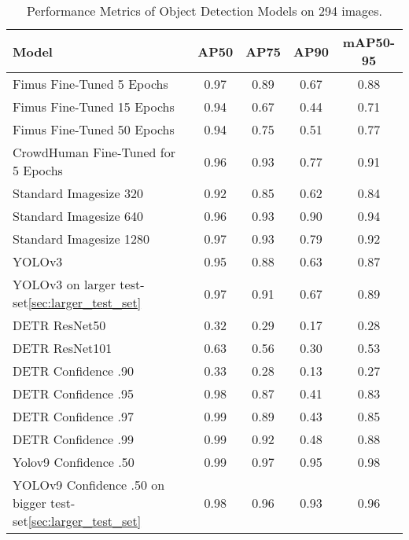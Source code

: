 \begin{table}[H]
    \centering
    \renewcommand{\arraystretch}{1.5} %
    \setlength{\tabcolsep}{1em}
    \begin{tabular}{|l|c|c|c|c|}
        \hline
        \rowcolor{gray!25}
        \textbf{Model} & \textbf{AP50} & \textbf{AP75} & \textbf{AP90} & \textbf{mAP50-95} \\ \hline
		Fimus Fine-Tuned 5 Epochs              & 0.97 & 0.89 & 0.67 & 0.88 \\ \hline
		Fimus Fine-Tuned 15 Epochs             & 0.94 & 0.67 & 0.44 & 0.71 \\ \hline
		Fimus Fine-Tuned 50 Epochs             & 0.94 & 0.75 & 0.51 & 0.77 \\ \hline
		CrowdHuman Fine-Tuned for 5 Epochs	   & 0.96 & 0.93 & 0.77 & 0.91 \\ \hline
		Standard Imagesize 320 		           & 0.92 & 0.85 & 0.62 & 0.84 \\ \hline
		Standard Imagesize 640 		           & 0.96 & 0.93 & 0.90 & 0.94 \\ \hline
		Standard Imagesize 1280		           & 0.97 & 0.93 & 0.79 & 0.92 \\ \hline
		YOLOv3 							       & 0.95 & 0.88 & 0.63 & 0.87 \\ \hline
		YOLOv3 on larger test-set\ref{sec:larger_test_set}			       					& 0.97 & 0.91 & 0.67 & 0.89 \\ \hline
		DETR ResNet50					   	   & 0.32 & 0.29 & 0.17 & 0.28 \\ \hline	
		DETR ResNet101					       & 0.63 & 0.56 & 0.30 & 0.53 \\ \hline 
		DETR Confidence .90					   & 0.33 & 0.28 & 0.13 & 0.27 \\ \hline
		DETR Confidence .95					   & 0.98 & 0.87 & 0.41 & 0.83 \\ \hline
		DETR Confidence .97					   & 0.99 & 0.89 & 0.43	& 0.85 \\ \hline
		DETR Confidence .99					   & 0.99 & 0.92 & 0.48 & 0.88 \\ \hline
		Yolov9 Confidence .50				   & 0.99 & 0.97 & 0.95 & 0.98 \\ \hline
		YOLOv9 Confidence .50 on bigger test-set\ref{sec:larger_test_set} & 0.98 & 0.96 & 0.93 & 0.96 \\ \hline
    \end{tabular}
    \caption{\centering Performance Metrics of Object Detection Models on 294 images. }
    \label{tab:performance_metrics}
\end{table}

